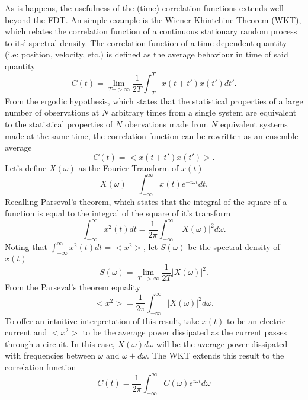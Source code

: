 As is happens, the usefulness of the (time) correlation functions extends well beyond the FDT. An simple example is the Wiener-Khintchine Theorem (WKT), which relates the correlation function of a continuous stationary random process to its' spectral density. The correlation function of a time-dependent quantity (i.e: position, velocity, etc.) is defined as the average behaviour in time of said quantity \cite{mcquarrie}
%
\begin{equation}
C(t)=\lim_{T->\infty}\frac{1}{2T}\int_{-T}^{T}x(t+t')x(t')dt'.
\end{equation}
%
From the ergodic hypothesis, which states that the statistical properties of a large number of observations at $N$ arbitrary times from a single system are equivalent to the statistical properties of $N$ obervations made from $N$ equivalent systems made at the same time, the correlation function can be rewritten as an ensemble average
%
\begin{equation}
C(t)=<x(t+t')x(t')>.
\end{equation}
%
Let's define $X(\omega)$ as the Fourier Transform of $x(t)$
%
\begin{equation}
X(\omega)=\int_{-\infty}^{\infty}x(t)e^{-i\omega t}dt.
\end{equation}
%
Recalling Parseval's theorem, which states that the integral of the square of a function is equal to the integral of the square of it's transform
%
\begin{equation}
\int_{-\infty}^{\infty}x^2(t)dt=\frac{1}{2\pi}\int_{-\infty}^{\infty}|X(\omega)|^2d\omega.
\end{equation}
%
Noting that $\int_{-\infty}^{\infty}x^2(t)dt=<x^2>$, let $S(\omega)$ be the spectral density of $x(t)$
%
\begin{equation}
S(\omega)=\lim_{T->\infty}\frac{1}{2T}|X(\omega)|^2.
\end{equation}
%
From the Parseval's theorem equality
%
\begin{equation}
<x^2>=\frac{1}{2\pi}\int_{-\infty}^{\infty}|X(\omega)|^2d\omega.
\end{equation}
%
To offer an intuitive interpretation of this result, take $x(t)$ to be an electric current and $<x^2>$ to be the average power dissipated as the current passes through a circuit. In this case, $X(\omega)d\omega$ will be the average power dissipated with frequencies between $\omega$ and $\omega+d\omega$. The WKT extends this result to the correlation function
%
\begin{equation}
C(t)=\frac{1}{2\pi}\int_{-\infty}^{\infty}C(\omega)e^{i\omega t}d\omega
\end{equation}
